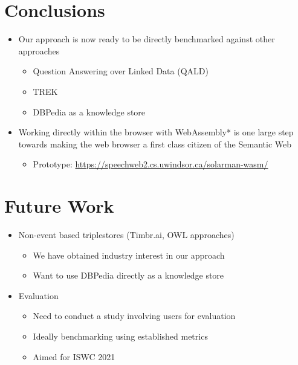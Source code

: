\documentclass[logoontitle,tabu,supertabular,aspectratio=43]{preney-uwindsor-beamer}
\begin{document}
    \section{Conclusions}
    \begin{frame}{\insertsection}
        \begin{itemize}
            \item Our approach is now ready to be directly benchmarked against other approaches
            \begin{itemize}
                \item Question Answering over Linked Data (QALD)
                \item TREK %
                \item DBPedia as a knowledge store
            \end{itemize}
            \item Working directly within the browser with WebAssembly* is one large step towards making the web browser a first class citizen of the Semantic Web
            \begin{itemize}
                \item Prototype: \url{https://speechweb2.cs.uwindsor.ca/solarman-wasm/}
            \end{itemize}
        \end{itemize}
    \end{frame}

	\section{Future Work}
	\begin{frame}{\insertsection}
		\begin{itemize}
            \item Non-event based triplestores (Timbr.ai, OWL approaches)
            \begin{itemize}
                \item We have obtained industry interest in our approach
                \item Want to use DBPedia directly as a knowledge store
            \end{itemize}
            \item Evaluation %
            \begin{itemize}
                \item Need to conduct a study involving users for evaluation
                \item Ideally benchmarking using established metrics
                \item Aimed for ISWC 2021
            \end{itemize}
		\end{itemize}
	\end{frame}
\end{document}
